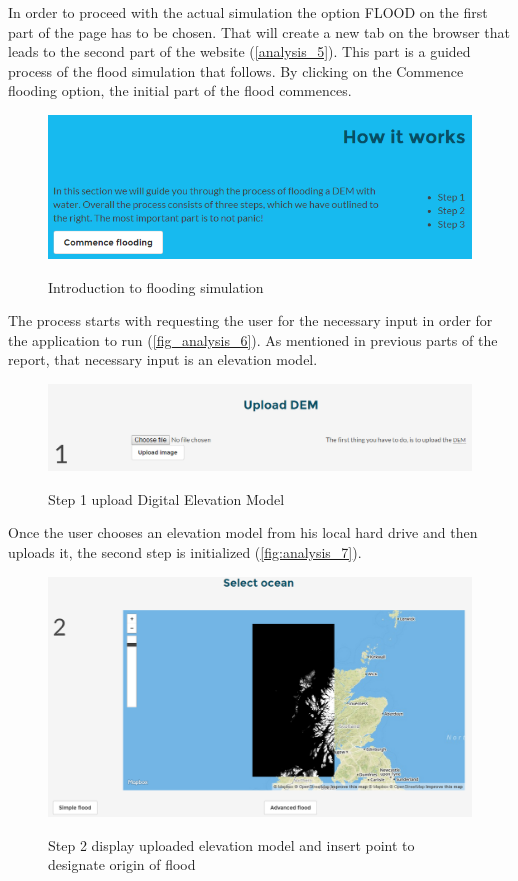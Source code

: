 In order to proceed with the actual simulation the option FLOOD on the first part of the page has to be chosen. That will create a new tab on the browser that leads to the second part of the website (\autoref{analysis_5}). This part is a guided process of the flood simulation that follows. By clicking on the Commence flooding option, the initial part of the flood commences.

\begin{figure}[h!]
\centering
	{\includegraphics[width=0.75\linewidth]{gfx/Analysis_Website/5.png}}
\caption{Introduction to flooding simulation}
\label{fig:analysis_5}
\end{figure}

The process starts with requesting the user for the necessary input in order for the application to run (\autoref{fig_analysis_6}). As mentioned in previous parts of the report, that necessary input is an elevation model. 

\begin{figure}[h!]
\centering
	{\includegraphics[width=0.75\linewidth]{gfx/Analysis_Website/6.png}}
\caption{Step 1 upload Digital Elevation Model}
\label{fig:analysis_6}
\end{figure}

Once the user chooses an elevation model from his local hard drive and then uploads it, the second step is initialized (\autoref{fig:analysis_7}). 


\begin{figure}[h!]
\centering
	{\includegraphics[width=0.75\linewidth]{gfx/Analysis_Website/7.png}}
\caption{Step 2 display uploaded elevation model and insert point to designate origin of flood}
\label{fig:analysis_7}
\end{figure}

